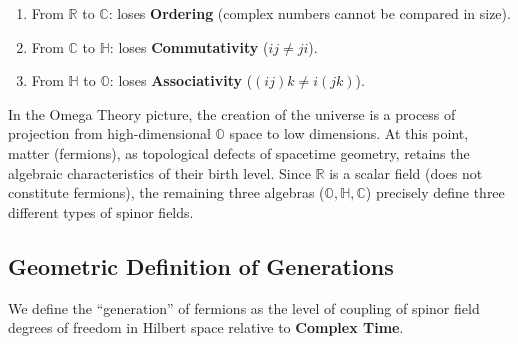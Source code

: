 \begin{enumerate}
\item From $\mathbb{R}$ to $\mathbb{C}$: loses \textbf{Ordering} (complex numbers cannot be compared in size).
\item From $\mathbb{C}$ to $\mathbb{H}$: loses \textbf{Commutativity} ($ij \neq ji$).
\item From $\mathbb{H}$ to $\mathbb{O}$: loses \textbf{Associativity} ($(ij)k \neq i(jk)$).
\end{enumerate}

In the Omega Theory picture, the creation of the universe is a process of projection from high-dimensional $\mathbb{O}$ space to low dimensions. At this point, matter (fermions), as topological defects of spacetime geometry, retains the algebraic characteristics of their birth level. Since $\mathbb{R}$ is a scalar field (does not constitute fermions), the remaining three algebras ($\mathbb{O}, \mathbb{H}, \mathbb{C}$) precisely define three different types of spinor fields.

\subsection{Geometric Definition of Generations}

We define the ``generation'' of fermions as the level of coupling of spinor field degrees of freedom in Hilbert space relative to \textbf{Complex Time}.

